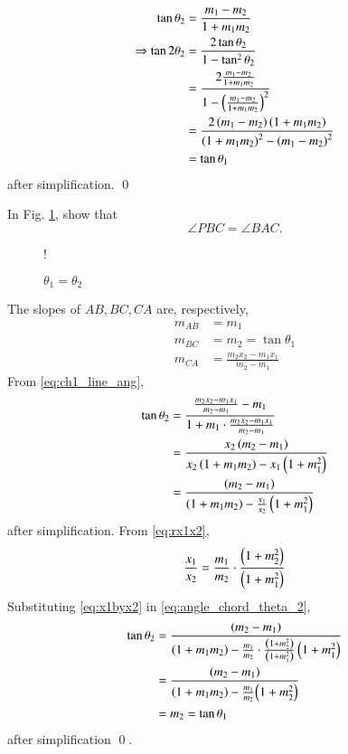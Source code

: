 \begin{align}
\tan \theta_2 &= \frac{m_1-m_2}{1+m_1m_2}
\\
\Rightarrow \tan2\theta_2 &= \frac{2\tan\theta_2}{1-\tan^2\theta_2} 
\\
&= \frac{2\frac{m_1-m_2}{1+m_1m_2}}{1-\left(\frac{m_1-m_2}{1+m_1m_2}\right)^2}
\\
&= \frac{2\left(m_1-m_2\right)\left(1+m_1m_2\right)}{\left(1+m_1m_2\right)^2-\left(m_1-m_2\right)^2}
\\
&= \tan\theta_1
\end{align}
after simplification. \qed
\begin{problem}
In Fig. \ref{fig:angle_chord}, show that
\begin{equation}
\angle PBC = \angle BAC.
\end{equation}
\end{problem}
\begin{figure}[!h]
\centering
\resizebox {\columnwidth} {!} {

}
\caption{$\theta_1=\theta_2$}
\label{fig:angle_chord}
\end{figure}
\solution
The slopes of $AB, BC, CA$ are, respectively,
\begin{align}
m_{AB} &= m_1 
\\
m_{BC} &= m_2 =\tan\theta_1
\\
m_{CA} &= \frac{m_2x_2-m_1x_1}{m_2-m_1}
\end{align}
From \eqref{eq:ch1_line_ang},
\begin{align}
\tan \theta_2 &= \frac{\frac{m_2x_2-m_1x_1}{m_2-m_1}-m_1}{1+m_1\cdot\frac{m_2x_2-m_1x_1}{m_2-m_1}} 
\\
&= \frac{x_2\left(m_2-m_1\right)}{x_2\left(1+m_1m_2\right)-x_1\left(1+m_1^2\right)}
\\
&= \frac{\left(m_2-m_1\right)}{\left(1+m_1m_2\right)-\frac{x_1}{x_2}\left(1+m_1^2\right)}
\label{eq:angle_chord_theta_2}
\end{align} 
after simplification. From \eqref{eq:rx1x2},
\begin{equation}
\label{eq:x1byx2}
\frac{x_1}{x_2} = \frac{m_1}{m_2}\cdot\frac{\left(1+m_2^2\right)}{\left(1+m_1^2\right)} 
\end{equation}
%
Substituting \eqref{eq:x1byx2} in \eqref{eq:angle_chord_theta_2},
\begin{align}
\tan \theta_2 &= \frac{\left(m_2-m_1\right)}{\left(1+m_1m_2\right)-\frac{m_1}{m_2}\cdot\frac{\left(1+m_2^2\right)}{\left(1+m_1^2\right)} \left(1+m_1^2\right)}
\\
&= \frac{\left(m_2-m_1\right)}{\left(1+m_1m_2\right)-\frac{m_1}{m_2}{\left(1+m_2^2\right)}}
\\
&= m_2 = \tan\theta_1 
\end{align}
after simplification \qed.